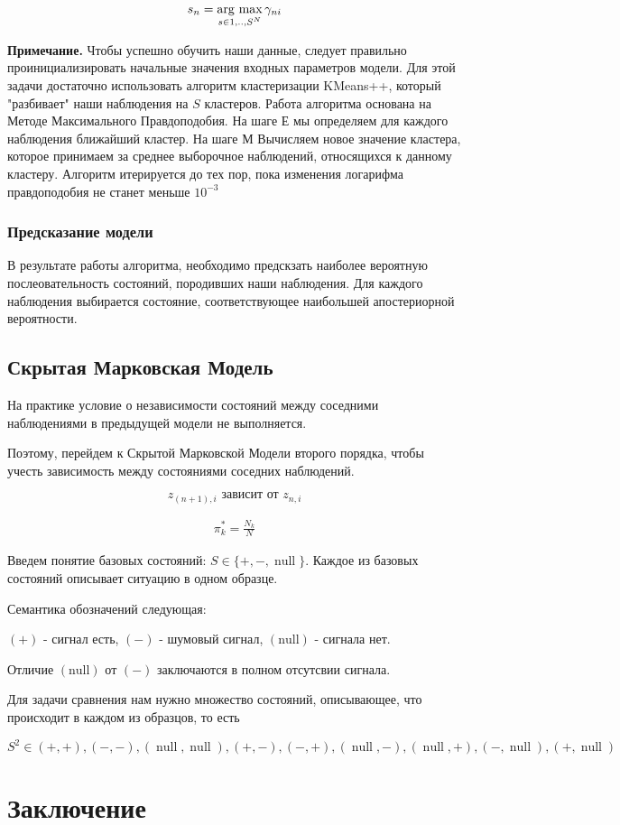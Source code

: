 \documentclass{matmex-diploma}
\begin{document}
$$s_n = \mathop{\rm arg~max}\limits_{s \in {1,..,S}^N} {\gamma_{ni}} $$

\textbf{Примечание.} Чтобы успешно обучить наши данные, следует правильно проинициализировать начальные значения входных параметров модели. Для этой задачи достаточно использовать алгоритм кластеризации KMeans++, который "разбивает" наши наблюдения на $S$ кластеров. Работа алгоритма основана на Методе Максимального Правдоподобия. На шаге Е мы определяем для каждого наблюдения ближайший кластер. На шаге М Вычисляем новое значение кластера, которое принимаем за среднее выборочное наблюдений, относящихся к данному кластеру. Алгоритм итерируется до тех пор, пока изменения логарифма правдоподобия не станет меньше $10^{-3}$

\subsubsection{Предсказание модели}

В результате работы алгоритма, необходимо предскзать наиболее вероятную послеовательность состояний, породивших наши наблюдения.
Для каждого наблюдения выбирается состояние, соответствующее наибольшей апостериорной вероятности.

\subsection{Скрытая Марковская Модель}

На практике условие о независимости  состояний между соседними наблюдениями в предыдущей модели не выполняется.

Поэтому, перейдем к Скрытой Марковской Модели второго порядка, чтобы учесть зависимость между состояниями соседних наблюдений.

\[
z_{(n+1),i} \mbox{ зависит от } z_{n,i}
\]

\begin{align*}
\pi_{k}^* = \frac{N_k}{N} 
\end{align*}

Введем понятие базовых состояний: $ S \in \{+, -, \operatorname{null}\}$.
Каждое из базовых состояний описывает ситуацию в одном образце. 

Семантика обозначений следующая:

$(+)$ - сигнал есть,  $(-)$ - шумовый сигнал, $\operatorname{(null)}$ - сигнала нет.

Отличие $\operatorname{(null)}$ от $(-)$ заключаются в полном отсутсвии сигнала.

Для задачи сравнения нам нужно множество состояний, описывающее, что происходит в каждом из образцов, то есть

$S^2 \in {(+,+),(-,-),(\operatorname{null},\operatorname{null}),
(+,-),(-,+),(\operatorname{null},-),(\operatorname{null},+),(-,\operatorname{null}),(+,\operatorname{null})}$



\section*{Заключение}



\end{document}

